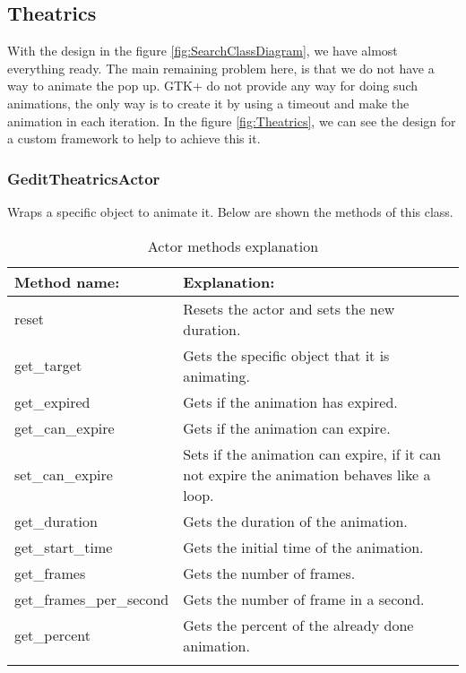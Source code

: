 \newpage
{}

\newpage
\subsection{Theatrics}\label{sec:Theatrics}

With the design in the figure \ref{fig:SearchClassDiagram}, we have almost everything ready. The main remaining problem here, is that we do not have a way to animate the pop up. GTK+ do not provide any way for doing such animations, the only way is to create it by using a timeout and make the animation in each iteration. In the figure \ref{fig:Theatrics}, we can see the design for a custom framework to help to achieve this it.


\subsubsection{GeditTheatricsActor}

Wraps a specific object to animate it. Below are shown the methods of this class.

\begin{table}[H]
  \begin{center}
    \begin{tabularx}{\textwidth}{|X|X|}
      \firsthline
      \textbf{Method name:} & \textbf{Explanation:} \\
      \hline
      reset & Resets the actor and sets the new duration. \\
      \hline
      get\_target & Gets the specific object that it is animating. \\
      \hline
      get\_expired & Gets if the animation has expired. \\
      \hline
      get\_can\_expire & Gets if the animation can expire. \\
      \hline
      set\_can\_expire & Sets if the animation can expire, if it can not expire the animation behaves like a loop. \\
      \hline
      get\_duration & Gets the duration of the animation. \\
      \hline
      get\_start\_time & Gets the initial time of the animation. \\
      \hline
      get\_frames & Gets the number of frames. \\
      \hline
      get\_frames\_per\_second & Gets the number of frame in a second. \\
      \hline
      get\_percent & Gets the percent of the already done animation. \\
      \lasthline
    \end{tabularx}
    \caption{Actor methods explanation}
  \end{center}
\end{table}

